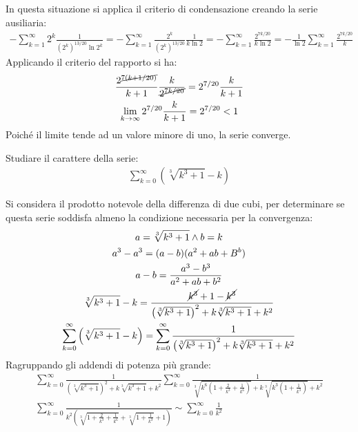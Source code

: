 \documentclass{article}
\numberwithin{equation}{subsection}
\begin{document}
In questa situazione si applica il criterio di condensazione creando la serie ausiliaria:
\begin{gather*}
    -\displaystyle\sum_{k=1}^\infty2^k\frac{1}{(2^k)^{13/20}\ln 2^k}=
    -\displaystyle\sum_{k=1}^\infty\frac{2^k}{(2^k)^{13/20}}\frac{1}{k\ln 2}=
    -\displaystyle\sum_{k=1}^\infty\frac{2^{7k/20}}{k\ln 2}=-\frac{1}{\ln 2}\sum_{k=1}^\infty\frac{2^{7k/20}}{k}
\end{gather*}
Applicando il criterio del rapporto si ha:
\begin{gather*}
    \displaystyle\frac{2^{\cancel{7(k+1/20)}}}{k+1}\frac{k}{\cancel{2^{7k/20}}}=2^{7/20}\frac{k}{k+1}\\
    \lim_{k\to\infty}2^{7/20}\frac{k}{k+1}=2^{7/20}<1
\end{gather*}
Poiché il limite tende ad un valore minore di uno, la serie converge. 



Studiare il carattere della serie:
\begin{gather*}
    \displaystyle\sum_{k=0}^\infty\left(\sqrt[3]{k^3+1}-k\right)
\end{gather*}

Si considera il prodotto notevole della differenza di due cubi, per determinare se questa serie soddisfa almeno la condizione necessaria per la convergenza:
\begin{gather*}
    \displaystyle a=\sqrt[3]{k^3+1}\land b=k\\
    \displaystyle a^3-a^3=(a-b)(a^2+ab+B^b)\\
    \displaystyle a-b=\frac{a^3-b^3}{a^2+ab+b^2}\\
    \displaystyle\sqrt[3]{k^3+1}-k=\frac{\cancel{k^3}+1-\cancel{k^3}}{\left(\sqrt[3]{k^3+1}\right)^2+k\sqrt[3]{k^3+1}+k^2}\\
    \displaystyle\sum_{k=0}^\infty\left(\sqrt[3]{k^3+1}-k\right)=
    \sum_{k=0}^\infty\frac{1}{\left(\sqrt[3]{k^3+1}\right)^2+k\sqrt[3]{k^3+1}+k^2}
\end{gather*}
Ragruppando gli addendi di potenza più grande:
\begin{gather*}
    \sum_{k=0}^\infty\frac{1}{\left(\sqrt[3]{k^3+1}\right)^2+k\sqrt[3]{k^3+1}+k^2}
    \displaystyle\sum_{k=0}^\infty\frac{1}{\sqrt[3]{k^6\left(1+\frac{2}{k^3}+\frac{1}{k^6}\right)}+k\sqrt[3]{k^3\left(1+\frac{1}{k^3}\right)}+k^2}\\
    \sum_{k=0}^\infty\frac{1}{k^2\left(\sqrt[3]{1+\frac{2}{k^3}+\frac{1}{k^6}}+\sqrt[3]{1+\frac{1}{k^3}}+1\right)}
    \sim\sum_{k=0}^\infty\frac{1}{k^2}
\end{gather*}
\end{document}
